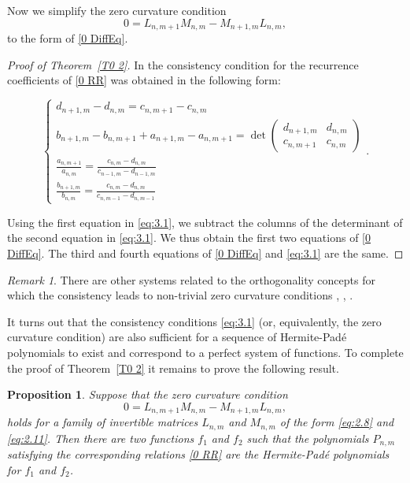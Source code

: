 \documentclass{amsart}
\newtheorem{proposition}[theorem]{Proposition}
\theoremstyle{remark}
\newtheorem{remark}[theorem]{Remark}
\numberwithin{equation}{section}
\begin{document}
Now we simplify the zero curvature condition
\[
0 = L_{n,m+1} M_{n,m} -  M_{n+1,m} L_{n,m},
\]
to the form of \eqref{0 DiffEq}.
\begin{proof}[Proof of Theorem~\ref{T0 2}] In \cite{vanA2011} the consistency condition for the  recurrence coefficients of \eqref{0 RR} was obtained in the following form:
\smallskip

\begin{equation} \label{eq:3.1}\begin{cases}
    d_{n+1,m}-d_{n,m} = c_{n,m+1} - c_{n,m} \\
    b_{n+1,m}-b_{n,m+1} + a_{n+1,m}-a_{n,m+1} = \det \begin{pmatrix} d_{n+1,m} & d_{n,m} \\
	                                                             c_{n,m+1} & c_{n,m} \end{pmatrix}
  \\
   \displaystyle \frac{a_{n,m+1}}{a_{n,m}} = \frac{c_{n,m}-d_{n,m}}{c_{n-1,m}-d_{n-1,m}}  \\
   \displaystyle \frac{b_{n+1,m}}{b_{n,m}} = \frac{c_{n,m}-d_{n,m}}{c_{n,m-1}-d_{n,m-1}}
\end{cases}.\end{equation}
\smallskip

Using the first equation in \eqref{eq:3.1}, we subtract the columns of the determinant of the second equation in \eqref{eq:3.1}. We thus obtain the first two equations of \eqref{0 DiffEq}. The third and fourth equations of \eqref{0 DiffEq} and \eqref{eq:3.1} are the same.
\end{proof}

\begin{remark}
There are other systems related to the orthogonality concepts for which the consistency leads to non-trivial zero curvature conditions  \cite{PGR1995}, \cite{SNderK2011}, \cite{SpZh}.
\end{remark}

It turns out that the consistency conditions \eqref{eq:3.1} (or, equivalently, the zero curvature condition) are also sufficient for a sequence of {Her\-mite-Pad\'e}{} polynomials
to exist and correspond to a perfect system of functions. To complete the proof of  Theorem~\ref{T0 2} it remains to prove the following result.

\begin{proposition}
Suppose that the zero curvature condition
\[
0 = L_{n,m+1} M_{n,m} -  M_{n+1,m} L_{n,m},
\]
holds for a family of invertible matrices $L_{n,m}$ and $M_{n,m}$ of the form \eqref{eq:2.8} and \eqref{eq:2.11}.
Then there are two functions $f_1$ and $f_2$ such that the polynomials $P_{n,m}$ satisfying the corresponding
relations \eqref{0 RR} are the {Her\-mite-Pad\'e}{} polynomials for $f_1$ and $f_2$.
\end{proposition}
\end{document}
